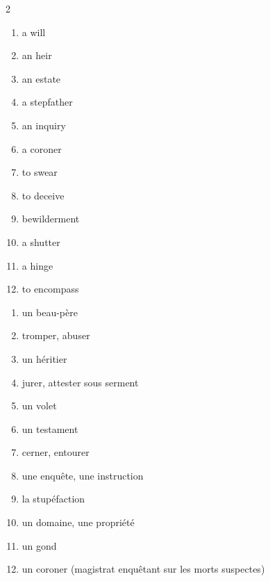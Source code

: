 \documentclass{fiche}
\begin{document}


\begin{multicols}{2}
\begin{enumerate}[label=\arabic*.,itemsep=1.2mm,leftmargin=*]
  \item a will \hfill {}
  \item an heir \hfill {}
  \item an estate \hfill {}
  \item a stepfather \hfill {}
  \item an inquiry \hfill {}
  \item a coroner \hfill {}
  \item to swear \hfill {}
  \item to deceive \hfill {}
  \item bewilderment \hfill {}
  \item a shutter \hfill {}
  \item a hinge \hfill {}
  \item to encompass \hfill {}
\end{enumerate}
\columnbreak
\begin{enumerate}[label=\alph*.,itemsep=1.2mm,leftmargin=*]
  \item un beau-père
  \item tromper, abuser
  \item un héritier
  \item jurer, attester sous serment
  \item un volet
  \item un testament
  \item cerner, entourer
  \item une enquête, une instruction
  \item la stupéfaction
  \item un domaine, une propriété
  \item un gond
  \item un coroner (magistrat enquêtant sur les morts suspectes)
\end{enumerate}
\end{multicols}
\end{document}
